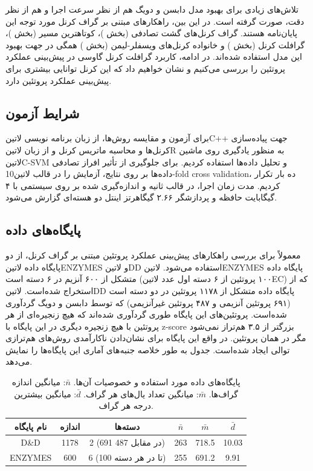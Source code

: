 تلاش‌های زیادی برای بهبود مدل دابسن و دویگ هم از نظر سرعت اجرا و هم از نظر دقت، صورت گرفته است. در این بین، راهکارهای مبتنی بر گراف کرنل مورد توجه این پایان‌نامه هستند. گراف کرنل‌های گشت تصادفی (بخش )، کوتاهترین مسیر (بخش )، گرافلت کرنل (بخش ) و خانواده کرنل‌های ویسفلر-لیمن (بخش ) همگی در جهت بهبود این مدل استفاده شده‌اند. در ادامه، کاربرد گرافلت کرنل گاوسی در پیش‌بینی عملکرد پروتئین را بررسی می‌کنیم و نشان خواهیم داد که این کرنل توانایی بیشتری برای پیش‌بینی عملکرد پروتئین دارد.

\subsection{شرایط آزمون}
برای آزمون و مقایسه روش‌ها، از زبان برنامه نویسی ‌لاتین{C++} جهت پیاده‌سازی کرنل‌ها و محاسبه ماتریس کرنل و از زبان ‌لاتین{R} به منظور یادگیری روی ماشین ‌لاتین{C-SVM} و تحلیل داده‌ها استفاده کردیم. برای جلوگیری از تأثیر افراز تصادفی داده‌ها بر روی نتایج، آزمایش را در قالب ‌لاتین{10-fold cross validation}، ده بار تکرار کردیم. مدت زمان اجرا، در قالب ثانیه و اندازه‌گیری شده بر روی سیستمی با ۴ گیگابایت حافظه و پردازشگر ۲.۶۶ گیگاهرتز اینتل دو هسته‌ای گزارش می‌شود.

\subsection{پایگاه‌های داده}
معمولاً برای بررسی راهکارهای پیش‌بینی عملکرد پروتئین مبتنی بر گراف کرنل، از دو پایگاه داده ‌لاتین{ENZYMES} و ‌لاتین{DD} استفاده می‌شود. ‌لاتین{ENZYMES} پایگاه داده متشکل از ۶۰۰ آنزیم در ۶ دسته است (۱۰۰ پروتئین از ۶ دسته اول عدد ‌لاتین{EC}) که از  استخراج شده‌است. ‌لاتین{DD} پایگاه داده متشکل از ۱۱۷۸ پروتئین در دو دسته است (۶۹۱ پروتئین آنزیمی و ۴۸۷ پروتئین غیرآنزیمی) که توسط دابسن و دویگ گردآوری شده‌است. پروتئین‌های این پایگاه طوری گردآوری شده‌اند که هیچ زنجیره‌ای از هر پروتئین با هیچ زنجیره دیگری در این پایگاه با z-score بزرگتر از ۳.۵ هم‌تراز نمی‌شود مگر در همان پروتئین. در واقع این پایگاه برای نشان‌دادن ناکارآمدی روش‌های هم‌ترازی توالی ایجاد شده‌است. جدول  به طور خلاصه جنبه‌های آماری این پایگاه‌ها را نمایش می‌دهد.

\begin{table}[ht]
\centering
\begin{tabular}{| c | c | c | c | c | c |}
    \hline
    نام پایگاه & اندازه & دسته‌ها & $\bar{n}$ & $\bar{m}$ & $\bar{d}$\\[5pt] \hline
    D\&D & 1178 & 2 (691 در مقابل 487) & 263 & 718.5 & 10.03 \\ \hline
    ENZYMES & 600 & 6 (100 تا در هر دسته) & 255 & 691.2 & 9.91 \\ \hline
\end{tabular}
\caption{
    پایگاه‌های داده مورد استفاده و خصوصیات آن‌ها.
 $\bar{n}$: میانگین اندازه گراف‌ها. $\bar{m}$: میانگین تعداد یال‌های هر گراف.  $\bar{d}$: میانگین بیشترین درجه هر گراف.
}
\label{tab:dataset-statistics}
\end{table}

